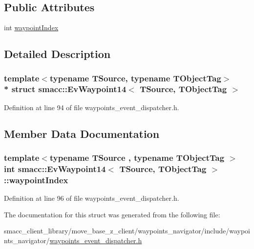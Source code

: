 \subsection*{Public Attributes}
\begin{DoxyCompactItemize}
\item 
int \hyperlink{structsmacc_1_1EvWaypoint14_a3e8c0ef9c1fe1a8ee7383e2d2f14525e}{waypoint\+Index}
\end{DoxyCompactItemize}


\subsection{Detailed Description}
\subsubsection*{template$<$typename T\+Source, typename T\+Object\+Tag$>$\\*
struct smacc\+::\+Ev\+Waypoint14$<$ T\+Source, T\+Object\+Tag $>$}



Definition at line 94 of file waypoints\+\_\+event\+\_\+dispatcher.\+h.



\subsection{Member Data Documentation}
\subsubsection[{\texorpdfstring{waypoint\+Index}{waypointIndex}}]{\setlength{\rightskip}{0pt plus 5cm}template$<$typename T\+Source , typename T\+Object\+Tag $>$ int {\bf smacc\+::\+Ev\+Waypoint14}$<$ T\+Source, T\+Object\+Tag $>$\+::waypoint\+Index}\hypertarget{structsmacc_1_1EvWaypoint14_a3e8c0ef9c1fe1a8ee7383e2d2f14525e}{}\label{structsmacc_1_1EvWaypoint14_a3e8c0ef9c1fe1a8ee7383e2d2f14525e}


Definition at line 96 of file waypoints\+\_\+event\+\_\+dispatcher.\+h.



The documentation for this struct was generated from the following file\+:\begin{DoxyCompactItemize}
\item 
smacc\+\_\+client\+\_\+library/move\+\_\+base\+\_\+z\+\_\+client/waypoints\+\_\+navigator/include/waypoints\+\_\+navigator/\hyperlink{waypoints__event__dispatcher_8h}{waypoints\+\_\+event\+\_\+dispatcher.\+h}\end{DoxyCompactItemize}
